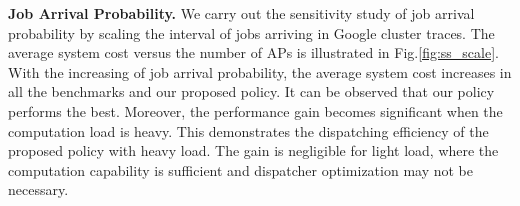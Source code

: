 \noindent\textbf{Job Arrival Probability.}
We carry out the sensitivity study of job arrival probability by scaling the interval of jobs arriving in Google cluster traces.
The average system cost versus the number of APs is illustrated in Fig.\ref{fig:ss_scale}.
With the increasing of job arrival probability, the average system cost increases in all the benchmarks and our proposed policy.
It can be observed that our policy performs the best.
Moreover, the performance gain becomes significant when the computation load is heavy.
This demonstrates the dispatching efficiency of the proposed policy with heavy load.
The gain is negligible for light load, where the computation capability is sufficient and dispatcher optimization may not be necessary.

